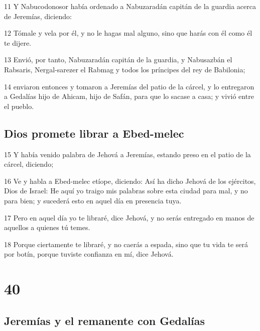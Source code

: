 \par 11 Y Nabucodonosor había ordenado a Nabuzaradán capitán de la guardia acerca de Jeremías, diciendo:
\par 12 Tómale y vela por él, y no le hagas mal alguno, sino que harás con él como él te dijere.
\par 13 Envió, por tanto, Nabuzaradán capitán de la guardia, y Nabusazbán el Rabsaris, Nergal-sarezer el Rabmag y todos los príncipes del rey de Babilonia;
\par 14 enviaron entonces y tomaron a Jeremías del patio de la cárcel, y lo entregaron a Gedalías hijo de Ahicam, hijo de Safán, para que lo sacase a casa; y vivió entre el pueblo.

\section*{Dios promete librar a Ebed-melec}

\par 15 Y había venido palabra de Jehová a Jeremías, estando preso en el patio de la cárcel, diciendo;
\par 16 Ve y habla a Ebed-melec etíope, diciendo: Así ha dicho Jehová de los ejércitos, Dios de Israel: He aquí yo traigo mis palabras sobre esta ciudad para mal, y no para bien; y sucederá esto en aquel día en presencia tuya.
\par 17 Pero en aquel día yo te libraré, dice Jehová, y no serás entregado en manos de aquellos a quienes tú temes.
\par 18 Porque ciertamente te libraré, y no caerás a espada, sino que tu vida te será por botín, porque tuviste confianza en mí, dice Jehová.

\chapter{40}

\section*{Jeremías y el remanente con Gedalías}

